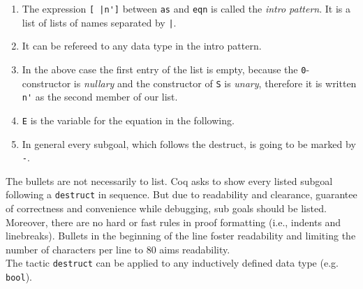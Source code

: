 		\begin{enumerate}
			\item The expression \lstinline![ |n']! between \lstinline!as! and \lstinline!eqn! is called the {\itshape intro pattern}. It is a list of lists of names separated by \lstinline!|!.
			\item It can be refereed to any data type in the intro pattern.
			\item In the above case the first entry of the list is empty, because the \lstinline!0!-constructor is {\itshape nullary} and the constructor of \lstinline!S! is {\itshape unary}, therefore it is written \lstinline!n'! as the second member of our list.
			\item \lstinline!E! is the variable for the equation in the following.
			\item In general every subgoal, which follows the destruct, is going to be marked by \lstinline!-!.
		\end{enumerate} 
		The bullets are not necessarily to list. 
		Coq asks to show every listed subgoal following a \lstinline!destruct! in sequence.
		But due to readability and clearance, guarantee of correctness and convenience while debugging, sub goals should be listed.\\	
		Moreover, there are no hard or fast rules in proof formatting (i.e., indents and linebreaks). 
		Bullets in the beginning of the line foster readability and limiting the number of characters per line to 80 aims readability.\\
		The tactic \lstinline!destruct! can be applied to any inductively defined data type (e.g. \lstinline!bool!).
		

